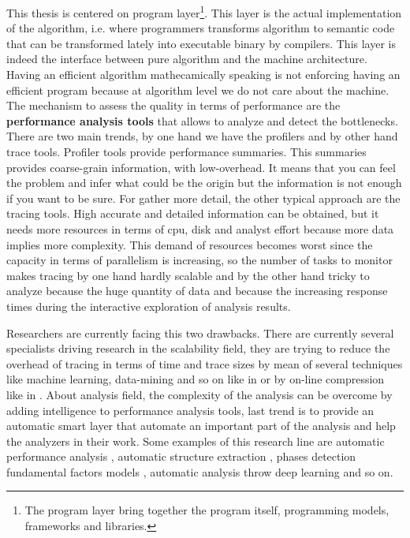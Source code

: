 \documentclass[10pt]{report}
\begin{document}
This thesis is centered on program layer\footnote{The program layer 
bring together the program itself, programming models, frameworks and libraries.}. 
This layer is the actual implementation of the algorithm, i.e. where programmers
transforms algorithm to  semantic code that can be transformed lately into
executable binary by compilers. This layer is indeed the interface between pure 
algorithm and the machine architecture. Having an efficient algorithm
mathecamically speaking is not enforcing having an efficient program 
because at algorithm level we do not care about the machine. 
The mechanism to assess the quality in terms of performance are the {\bf performance 
analysis tools} that allows to analyze and detect the bottlenecks. 
There are two main trends, by one hand we have the profilers and by other hand trace
tools. Profiler tools provide performance summaries. This summaries provides 
coarse-grain information, with low-overhead. It means that you can feel the problem 
and infer what could be the origin but the information is not enough if you want 
to be sure. For gather more detail, the other typical approach are the tracing 
tools. High accurate and detailed information can be obtained, but it needs 
more resources in terms of cpu, disk and analyst effort because more data implies 
more complexity. This demand of resources becomes worst since the capacity in 
terms of parallelism is increasing, so the number of tasks to monitor makes 
tracing by one hand hardly scalable and by the other hand tricky to analyze
because the huge quantity of data and because the increasing response times
during the interactive exploration of analysis results. 

Researchers are currently facing this two drawbacks. There are currently several
specialists driving research in the scalability field, they are trying to reduce 
the overhead of tracing in terms of time and trace sizes by mean of several 
techniques like machine learning, data-mining and so on like in 
\cite{llort2015intelligent} or by on-line compression like in
\cite{noeth2009scalatrace}. About analysis field, the complexity of the analysis 
can be overcome by adding intelligence to performance analysis tools, last 
trend is to provide an automatic smart layer that automate an important part 
of the analysis and help the analyzers in their work. Some examples of this 
research line are automatic performance analysis \cite{wolf2003automatic}, 
automatic structure extraction \cite{casas2007automatic}, phases detection 
\cite{gonzalez2013application} fundamental factors models \cite{casas2008aass}, 
automatic analysis throw deep learning \cite{simon:2017:perfdp} and so on.
\end{document}
